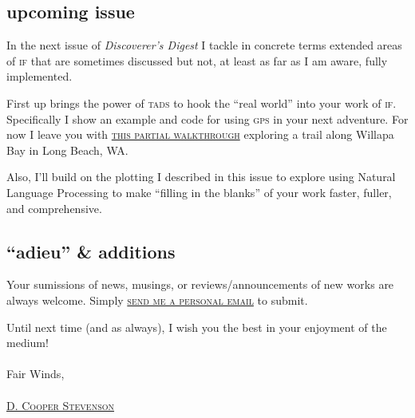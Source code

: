 \subsection{upcoming issue}
In the next issue of \textit{Discoverer's Digest} I tackle in concrete terms
extended areas of \textsc{if} that are sometimes discussed but not, at least as
far as I am aware, fully implemented.

First up brings the power of \textsc{tads} to hook the ``real world'' into your
work of \textsc{if}. Specifically I show an example and code for using
\textsc{gps} in your next adventure. For now I leave you with
\href{http://portfolio.cooper.stevenson.name/tarlatt/tarlatt_slough_trail_feature_demo.mp4}{\textsc{this
    partial walkthrough}} exploring a trail along Willapa Bay in Long Beach, WA.

Also, I'll build on the plotting I described in this issue to explore using
Natural Language Processing to make ``filling in the blanks'' of your work
faster, fuller, and comprehensive.

\subsection{``adieu'' \& additions}
Your sumissions of news, musings, or reviews/announcements of new works are
always welcome. Simply \href{mailto:cooper@cooper.stevenson.name}{\textsc{send
    me a personal email}} to submit.

Until next time (and as always), I wish you the best in your enjoyment of the
medium! \\ \\

\noindent Fair Winds, \\ \\

\noindent \href{mailto:cooper@cooper.stevenson.name}{\textsc{D. Cooper Stevenson}} 

